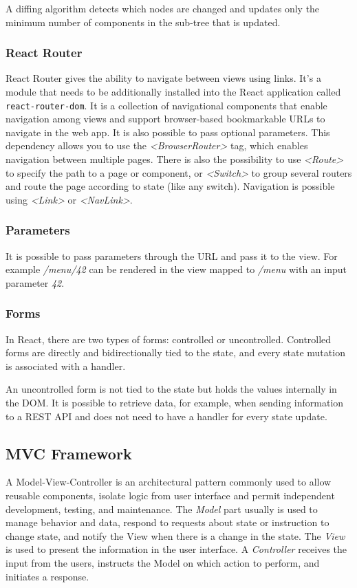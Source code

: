 A diffing algorithm detects which nodes are changed and updates only the minimum number of components in the sub-tree that is updated.

\subsubsection*{React Router}
React Router gives the ability to navigate between views using links. It's a module that needs to be additionally installed into the React application called \texttt{react-router-dom}. It is a collection of navigational components that enable navigation among views and support browser-based bookmarkable URLs to navigate in the web app. It is also possible to pass optional parameters.
This dependency allows you to use the \textit{<BrowserRouter>} tag, which enables navigation between multiple pages.
There is also the possibility to use \textit{<Route>} to specify the path to a page or component, or \textit{<Switch>} to group several routers and route the page according to state (like any switch).
Navigation is possible using \textit{<Link>} or \textit{<NavLink>}.

\subsubsection*{Parameters}
It is possible to pass parameters through the URL and pass it to the view. For example \textit{/menu/42} can be rendered in the view mapped to \textit{/menu} with an input parameter \textit{42}.

\subsubsection*{Forms}
In React, there are two types of forms: controlled or uncontrolled.
Controlled forms are directly and bidirectionally tied to the state, and every state mutation is associated with a handler.

An uncontrolled form is not tied to the state but holds the values internally in the DOM. It is possible to retrieve data, for example, when sending information to a REST API and does not need to have a handler for every state update.


\subsection*{MVC Framework}
A Model-View-Controller is an architectural pattern commonly used to allow reusable components, isolate logic from user interface and permit independent development, testing, and maintenance. 
The \textit{Model} part usually is used to manage behavior and data, respond to requests about state or instruction to change state, and notify the View when there is a change in the state.
The \textit{View} is used to present the information in the user interface.
A \textit{Controller} receives the input from the users, instructs the Model on which action to perform, and initiates a response.

